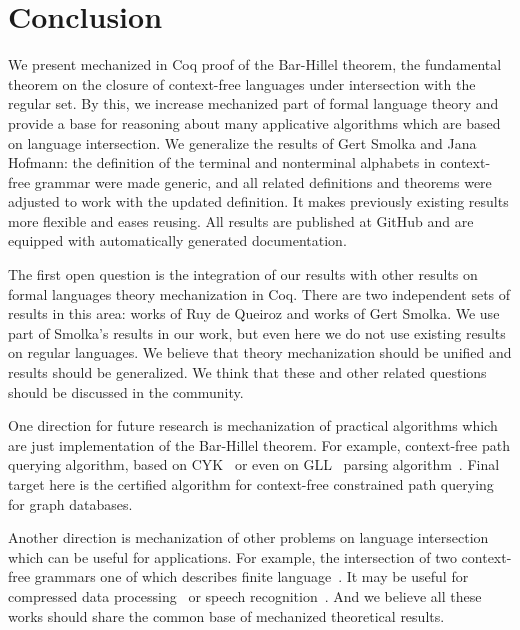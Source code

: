 \section{Conclusion}
\label{sec:conclusion}

We present mechanized in Coq proof of the Bar-Hillel theorem, the fundamental theorem on the closure of context-free languages under intersection with the regular set.
By this, we increase mechanized part of formal language theory and provide a base for reasoning about many applicative algorithms which are based on language intersection.
We generalize the results of Gert Smolka and Jana Hofmann: the definition of the terminal and nonterminal alphabets in context-free grammar were made generic, and all related definitions and theorems were adjusted to work with the updated definition.
It makes previously existing results more flexible and eases reusing.
All results are published at GitHub and are equipped with automatically generated documentation.

The first open question is the integration of our results with other results on formal languages theory mechanization in Coq.
There are two independent sets of results in this area: works of Ruy de Queiroz and works of Gert Smolka.
We use part of Smolka's results in our work, but even here we do not use existing results on regular languages.
We believe that theory mechanization should be unified and results should be generalized.
We think that these and other related questions should be discussed in the community.

One direction for future research is mechanization of practical algorithms which are just implementation of the Bar-Hillel theorem.
For example, context-free path querying algorithm, based on CYK~\cite{hellingsPathQuerying,zhang2016context} or even on GLL~\cite{scott2010gll} parsing algorithm~\cite{grigorev2016context}.
Final target here is the certified algorithm for context-free constrained path querying for graph databases.

Another direction is mechanization of other problems on language intersection which can be useful for applications.
For example, the intersection of two context-free grammars one of which describes finite language~\cite{nederhof2002parsing,nederhof2004language}.
It may be useful for compressed data processing~\cite{Lohrey2012AlgorithmicsOS} or speech recognition~\cite{Nederhof:2002:PNC:1073083.1073104,NEDERHOF2004172}.
And we believe all these works should share the common base of mechanized theoretical results.
